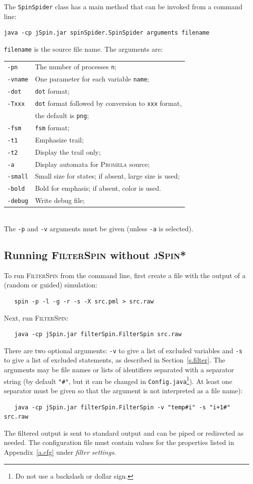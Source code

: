 \documentclass[11pt]{article}
\newcommand{\prm}{\textsc{Promela}}
\newcommand{\js}{\textsc{jSpin}}
\newcommand{\fil}{\textsc{FilterSpin}}
\newcommand{\dtf}{\texttt{dot}}
\newcommand{\fsm}{\texttt{fsm}}
\newcommand{\p}[1]{\texttt{#1}}
\begin{document}
The \p{SpinSpider} class has a main method that can be invoked from a command
line:
\begin{verbatim}
java -cp jSpin.jar spinSpider.SpinSpider arguments filename
\end{verbatim}
\p{filename} is the source file name. The arguments are:

\hspace*{1cm}
\begin{tabular}{ll}
\p{-pn} & The number of processes \p{n};\\
\p{-vname} & One parameter for each variable \p{name};\\
\p{-dot} & \dtf{} format;\\
\p{-Txxx} & \dtf{} format followed by conversion to \p{xxx} format,\\
& the default is \p{png};\\
\p{-fsm} & \fsm{} format;\\
\p{-t1} & Emphasize trail;\\
\p{-t2} & Display the trail only;\\
\p{-a} & Display automata for \prm{} source;\\
\p{-small} & Small size for states; if absent, large size is used;\\
\p{-bold} & Bold for emphasis; if absent, color is used.\\
\p{-debug} & Write debug file;\\
\end{tabular}\\
\noindent{}The \p{-p} and \p{-v} arguments must be given (unless \p{-a} is selected).

\subsection{Running \fil{} without \js{}*}
To run \fil{} from the command line, first create a file with the output
of a (random or guided) simulation:
\begin{verbatim}
   spin -p -l -g -r -s -X src.pml > src.raw
\end{verbatim}
Next, run \fil{}:
\begin{verbatim}
   java -cp jSpin.jar filterSpin.FilterSpin src.raw
\end{verbatim}
There are two optional arguments: \p{-v} to give a list of excluded
variables and \p{-s} to give a list of excluded statements, as described
in Section~\ref{s.filter}. The arguments may be file names or lists of
identifiers separated with a separator string (by default \p{"\#"}, but
it can be changed in \p{Config.java}\footnote{Do not use a backslash or
dollar sign.}). At least one separator must be given so that the
argument is not interpreted as a file name):
\begin{verbatim}
   java -cp jSpin.jar filterSpin.FilterSpin -v "temp#i" -s "i+1#" src.raw
\end{verbatim}
The filtered output is sent to standard output and can be piped or
redirected as needed. The configuration file must contain values for the
properties listed in Appendix~\ref{a.cfg} under \emph{filter settings}.
\end{document}
